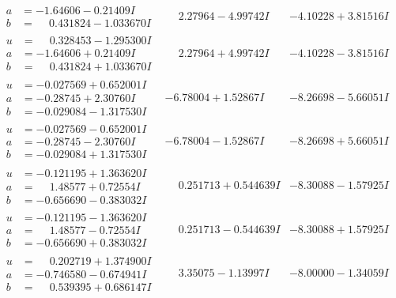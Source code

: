 \documentclass[1p]{elsarticle_modified}
\theoremstyle{definition}
\begin{document}
$$\begin{array}{c|c|c}
\begin{aligned}
a &= -1.64606 - 0.21409 I \\
b &= \phantom{-}0.431824 - 1.033670 I\end{aligned}
 & \phantom{-}2.27964 - 4.99742 I & -4.10228 + 3.81516 I \\ \hline\begin{aligned}
u &= \phantom{-}0.328453 - 1.295300 I \\
a &= -1.64606 + 0.21409 I \\
b &= \phantom{-}0.431824 + 1.033670 I\end{aligned}
 & \phantom{-}2.27964 + 4.99742 I & -4.10228 - 3.81516 I \\ \hline\begin{aligned}
u &= -0.027569 + 0.652001 I \\
a &= -0.28745 + 2.30760 I \\
b &= -0.029084 - 1.317530 I\end{aligned}
 & -6.78004 + 1.52867 I & -8.26698 - 5.66051 I \\ \hline\begin{aligned}
u &= -0.027569 - 0.652001 I \\
a &= -0.28745 - 2.30760 I \\
b &= -0.029084 + 1.317530 I\end{aligned}
 & -6.78004 - 1.52867 I & -8.26698 + 5.66051 I \\ \hline\begin{aligned}
u &= -0.121195 + 1.363620 I \\
a &= \phantom{-}1.48577 + 0.72554 I \\
b &= -0.656690 - 0.383032 I\end{aligned}
 & \phantom{-}0.251713 + 0.544639 I & -8.30088 - 1.57925 I \\ \hline\begin{aligned}
u &= -0.121195 - 1.363620 I \\
a &= \phantom{-}1.48577 - 0.72554 I \\
b &= -0.656690 + 0.383032 I\end{aligned}
 & \phantom{-}0.251713 - 0.544639 I & -8.30088 + 1.57925 I \\ \hline\begin{aligned}
u &= \phantom{-}0.202719 + 1.374900 I \\
a &= -0.746580 - 0.674941 I \\
b &= \phantom{-}0.539395 + 0.686147 I\end{aligned}
 & \phantom{-}3.35075 - 1.13997 I & -8.00000 - 1.34059 I \\ \hline\begin{aligned}

\end{aligned}
\end{array}$$
\end{document}
